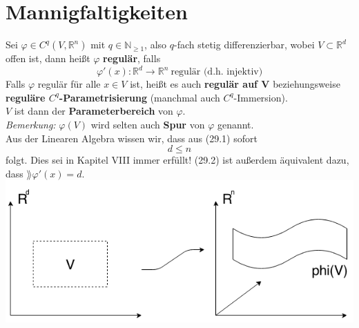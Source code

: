 \section{Mannigfaltigkeiten}
Sei $\varphi\in C^q(V,\mathbb{R}^n)$ mit $q\in\mathbb{N}_{\geq 1}$, 
also $q$-fach stetig differenzierbar, wobei $V\subset\mathbb{R}^d$ offen ist, 
dann heißt $\varphi$ \textbf{regulär}, falls
    \begin{equation}
    \varphi'(x):\mathbb{R}^d\rightarrow\mathbb{R}^n \ \text{regulär (d.h. injektiv)}
    \end{equation}
Falls $\varphi$ regulär für alle $x\in V$ ist, heißt es auch 
\textbf{regulär auf V} beziehungsweise \\
\textbf{reguläre $C^q$-Parametrisierung} (manchmal auch $C^q$-Immersion). \\
$V$ ist dann der \textbf{Parameterbereich} von $\varphi$.\\
\emph{Bemerkung:} $\varphi(V)$ wird selten auch \textbf{Spur} von $\varphi$ genannt.\\
\linebreak
\linebreak
Aus der Linearen Algebra wissen wir, dass aus (29.1) sofort 
    \begin{equation}
    d\leq n
    \end{equation}
folgt. Dies sei in Kapitel VIII immer erfüllt! (29.2) ist außerdem äquivalent dazu, dass 
$\rang \varphi'(x)=d$.\\
    \includegraphics[scale=0.5]{pictures/001-01}

